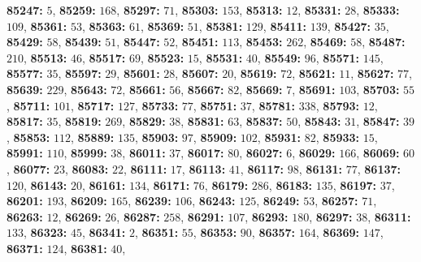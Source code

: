 \textsf{\bfseries 85247:} $5$, \textsf{\bfseries 85259:} $168$, \textsf{\bfseries 85297:} $71$, \textsf{\bfseries 85303:} $153$, \textsf{\bfseries 85313:} $12$, \textsf{\bfseries 85331:} $28$, \textsf{\bfseries 85333:} $109$, \textsf{\bfseries 85361:} $53$, \textsf{\bfseries 85363:} $61$, \textsf{\bfseries 85369:} $51$, \textsf{\bfseries 85381:} $129$, \textsf{\bfseries 85411:} $139$, \textsf{\bfseries 85427:} $35$, \textsf{\bfseries 85429:} $58$, \textsf{\bfseries 85439:} $51$, \textsf{\bfseries 85447:} $52$, \textsf{\bfseries 85451:} $113$, \textsf{\bfseries 85453:} $262$, \textsf{\bfseries 85469:} $58$, \textsf{\bfseries 85487:} $210$, \textsf{\bfseries 85513:} $46$, \textsf{\bfseries 85517:} $69$, \textsf{\bfseries 85523:} $15$, \textsf{\bfseries 85531:} $40$, \textsf{\bfseries 85549:} $96$, \textsf{\bfseries 85571:} $145$, \textsf{\bfseries 85577:} $35$, \textsf{\bfseries 85597:} $29$, \textsf{\bfseries 85601:} $28$, \textsf{\bfseries 85607:} $20$, \textsf{\bfseries 85619:} $72$, \textsf{\bfseries 85621:} $11$, \textsf{\bfseries 85627:} $77$, \textsf{\bfseries 85639:} $229$, \textsf{\bfseries 85643:} $72$, \textsf{\bfseries 85661:} $56$, \textsf{\bfseries 85667:} $82$, \textsf{\bfseries 85669:} $7$, \textsf{\bfseries 85691:} $103$, \textsf{\bfseries 85703:} $55$, \textsf{\bfseries 85711:} $101$, \textsf{\bfseries 85717:} $127$, \textsf{\bfseries 85733:} $77$, \textsf{\bfseries 85751:} $37$, \textsf{\bfseries 85781:} $338$, \textsf{\bfseries 85793:} $12$, \textsf{\bfseries 85817:} $35$, \textsf{\bfseries 85819:} $269$, \textsf{\bfseries 85829:} $38$, \textsf{\bfseries 85831:} $63$, \textsf{\bfseries 85837:} $50$, \textsf{\bfseries 85843:} $31$, \textsf{\bfseries 85847:} $39$, \textsf{\bfseries 85853:} $112$, \textsf{\bfseries 85889:} $135$, \textsf{\bfseries 85903:} $97$, \textsf{\bfseries 85909:} $102$, \textsf{\bfseries 85931:} $82$, \textsf{\bfseries 85933:} $15$, \textsf{\bfseries 85991:} $110$, \textsf{\bfseries 85999:} $38$, \textsf{\bfseries 86011:} $37$, \textsf{\bfseries 86017:} $80$, \textsf{\bfseries 86027:} $6$, \textsf{\bfseries 86029:} $166$, \textsf{\bfseries 86069:} $60$, \textsf{\bfseries 86077:} $23$, \textsf{\bfseries 86083:} $22$, \textsf{\bfseries 86111:} $17$, \textsf{\bfseries 86113:} $41$, \textsf{\bfseries 86117:} $98$, \textsf{\bfseries 86131:} $77$, \textsf{\bfseries 86137:} $120$, \textsf{\bfseries 86143:} $20$, \textsf{\bfseries 86161:} $134$, \textsf{\bfseries 86171:} $76$, \textsf{\bfseries 86179:} $286$, \textsf{\bfseries 86183:} $135$, \textsf{\bfseries 86197:} $37$, \textsf{\bfseries 86201:} $193$, \textsf{\bfseries 86209:} $165$, \textsf{\bfseries 86239:} $106$, \textsf{\bfseries 86243:} $125$, \textsf{\bfseries 86249:} $53$, \textsf{\bfseries 86257:} $71$, \textsf{\bfseries 86263:} $12$, \textsf{\bfseries 86269:} $26$, \textsf{\bfseries 86287:} $258$, \textsf{\bfseries 86291:} $107$, \textsf{\bfseries 86293:} $180$, \textsf{\bfseries 86297:} $38$, \textsf{\bfseries 86311:} $133$, \textsf{\bfseries 86323:} $45$, \textsf{\bfseries 86341:} $2$, \textsf{\bfseries 86351:} $55$, \textsf{\bfseries 86353:} $90$, \textsf{\bfseries 86357:} $164$, \textsf{\bfseries 86369:} $147$, \textsf{\bfseries 86371:} $124$, \textsf{\bfseries 86381:} $40$, 
